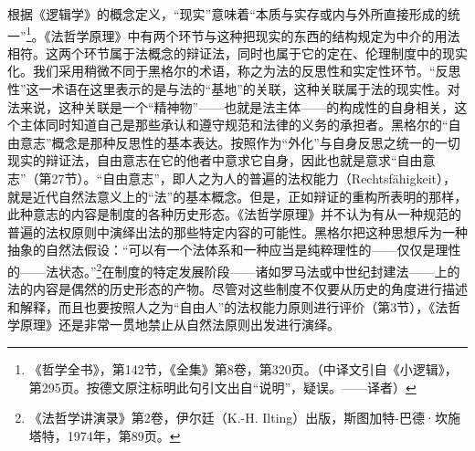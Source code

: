 根据《逻辑学》的概念定义，“现实”意味着“本质与实存或内与外所直接形成的统一”\footnote{《哲学全书》，第142节，《全集》第8卷，第320页。（中译文引自《小逻辑》，第295页。按德文原注标明此句引文出自“说明”，疑误。——译者）}。《法哲学原理》中有两个环节与这种把现实的东西的结构规定为中介的用法相符。这两个环节属于法概念的辩证法，同时也属于它的定在、伦理制度中的现实化。我们采用稍微不同于黑格尔的术语，称之为法的反思性和实定性环节。“反思性”这一术语在这里表示的是与法的“基地”的关联，这种关联属于法的现实性。对法来说，这种关联是一个“精神物”——也就是法主体——的构成性的自身相关，这个主体同时知道自己是那些承认和遵守规范和法律的义务的承担者。黑格尔的“自由意志”概念是那种反思性的基本表达。按照作为“外化”与自身反思之统一的一切现实的辩证法，自由意志在它的他者中意求它自身，因此也就是意求“自由意志”（第27节）。“自由意志”，即人之为人的普遍的法权能力（Rechtsfähigkeit），就是近代自然法意义上的“法”的基本概念。但是，正如辩证的重构所表明的那样，此种意志的内容是制度的各种历史形态。《法哲学原理》并不认为有从一种规范的普遍的法权原则中演绎出法的那些特定内容的可能性。黑格尔把这种思想斥为一种抽象的自然法假设：“可以有一个法体系和一种应当是纯粹理性的——仅仅是理性的——法状态。”\footnote{《法哲学讲演录》第2卷，伊尔廷（K.-H. Ilting）出版，斯图加特-巴德·坎施塔特，1974年，第89页。}在制度的特定发展阶段——诸如罗马法或中世纪封建法——上的法的内容是偶然的历史形态的产物。尽管对这些制度不仅要从历史的角度进行描述和解释，而且也要按照人之为“自由人”的法权能力原则进行评价（第3节），《法哲学原理》还是非常一贯地禁止从自然法原则出发进行演绎。

